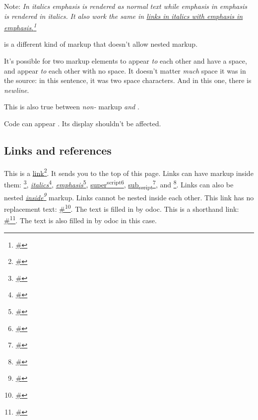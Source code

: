 Note: \emph{In italics \emph{emphasis} is rendered as normal text while \emph{emphasis \emph{in} emphasis} is rendered in italics.} \emph{It also work the same in \href{\#}{links in italics with \emph{emphasis \emph{in} emphasis}.}\footnote{\url{\#}}}

 is a different kind of markup that doesn't allow nested markup.

It's possible for two markup elements to appear  \emph{to} each other and have a space, and appear \emph{to} each other with no space. It doesn't matter  \emph{much} space it was in the source: in this sentence, it was two space characters. And in this one, there is  \emph{newline}.

This is also true between \emph{non-} markup \emph{and} .

Code can appear . Its display shouldn't be affected.

\subsection{Links and references\label{links-and-references}}%
This is a \href{\#}{link}\footnote{\url{\#}}. It sends you to the top of this page. Links can have markup inside them: \href{\#}{}\footnote{\url{\#}}, \href{\#}{\emph{italics}}\footnote{\url{\#}}, \href{\#}{\emph{emphasis}}\footnote{\url{\#}}, \href{\#}{super\textsuperscript{script}}\footnote{\url{\#}}, \href{\#}{sub\textsubscript{script}}\footnote{\url{\#}}, and \href{\#}{}\footnote{\url{\#}}. Links can also be nested \emph{\href{\#}{inside}\footnote{\url{\#}}} markup. Links cannot be nested inside each other. This link has no replacement text: \href{\#}{\#}\footnote{\url{\#}}. The text is filled in by odoc. This is a shorthand link: \href{\#}{\#}\footnote{\url{\#}}. The text is also filled in by odoc in this case.

